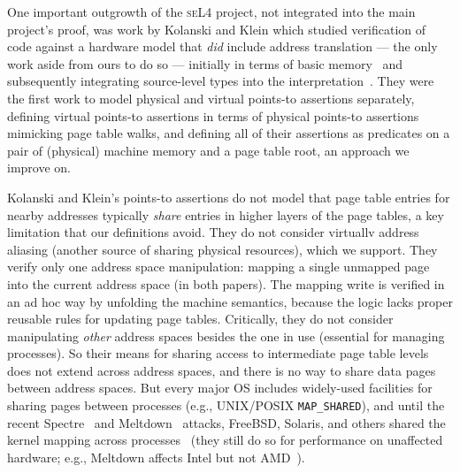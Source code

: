 
One important outgrowth of the \textsc{seL4} project, not integrated into the main project's proof, was work by Kolanski and Klein which studied verification of code against a hardware model that \emph{did} include address translation --- the only work aside from ours to do so --- initially in terms of basic memory~\cite{kolanski08vstte} and subsequently integrating source-level types into the interpretation~\cite{kolanski09tphols}. 
They were the first work to model physical and virtual points-to assertions separately, defining virtual points-to assertions in terms of physical points-to assertions mimicking page table walks, and defining all of their assertions as predicates on a pair of (physical) machine memory and a page table root, an approach we improve on.

Kolanski and Klein's points-to assertions do not model that page table entries for nearby addresses typically \emph{share} entries in higher layers of the page tables, a key limitation that our definitions avoid.
They do not consider virtuallv address aliasing (another source of sharing physical resources), which we support.
They verify only one address space manipulation: mapping a single unmapped page into the current address space (in both papers).
The mapping write is verified in an ad hoc way by unfolding the machine semantics, because the logic lacks proper reusable rules for
updating page tables.  
Critically, they do not consider
manipulating \emph{other} address spaces besides the one in use (essential for managing
processes).
So their means for sharing access to intermediate page table levels does not extend across address spaces, and there is no way to share data pages between address spaces.  But every major OS includes widely-used facilities for sharing pages between processes (e.g., UNIX/POSIX \texttt{MAP\_SHARED}), and until the recent Spectre~\cite{kocher2018spectre} and Meltdown~\cite{lipp2018meltdown} attacks, FreeBSD, Solaris, and others shared the kernel mapping across processes~\cite{mckusick2014design,mcdougall2006solaris,wininternals6a,wininternals6b} (they still do so for performance on unaffected hardware; e.g., Meltdown affects Intel but not AMD~\cite{amdmeltdown}).

